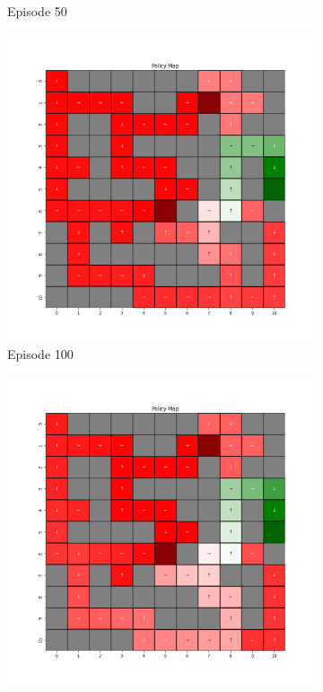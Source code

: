 \documentclass{assignment}
\begin{document}
\begin{figure}[H]
\begin{subfigure}{0.3\textwidth}
    \caption{Episode 50}
    \end{subfigure}\hfill
    \begin{subfigure}{0.3\textwidth}
        \includegraphics[width=\textwidth]{figures/policy_q/epsilon_sweep/policy_alpha_0.1_gamma_0.95_epsilon_0.0_iteration_100.png}
    \caption{Episode 100}
    \end{subfigure}
    \begin{subfigure}{0.3\textwidth}
        \includegraphics[width=\textwidth]{figures/policy_q/epsilon_sweep/policy_alpha_0.1_gamma_0.95_epsilon_0.0_iteration_1000.png}

\end{subfigure}
\end{figure}
\end{document}
